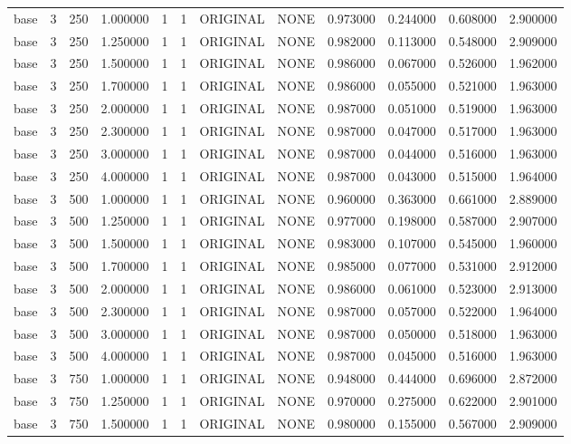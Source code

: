 \begin{tabular}{lrrrllllrrrr}
base & 3 & 250 & 1.000000 & 1 & 1 & ORIGINAL & NONE & 0.973000 & 0.244000 & 0.608000 & 2.900000 \\
base & 3 & 250 & 1.250000 & 1 & 1 & ORIGINAL & NONE & 0.982000 & 0.113000 & 0.548000 & 2.909000 \\
base & 3 & 250 & 1.500000 & 1 & 1 & ORIGINAL & NONE & 0.986000 & 0.067000 & 0.526000 & 1.962000 \\
base & 3 & 250 & 1.700000 & 1 & 1 & ORIGINAL & NONE & 0.986000 & 0.055000 & 0.521000 & 1.963000 \\
base & 3 & 250 & 2.000000 & 1 & 1 & ORIGINAL & NONE & 0.987000 & 0.051000 & 0.519000 & 1.963000 \\
base & 3 & 250 & 2.300000 & 1 & 1 & ORIGINAL & NONE & 0.987000 & 0.047000 & 0.517000 & 1.963000 \\
base & 3 & 250 & 3.000000 & 1 & 1 & ORIGINAL & NONE & 0.987000 & 0.044000 & 0.516000 & 1.963000 \\
base & 3 & 250 & 4.000000 & 1 & 1 & ORIGINAL & NONE & 0.987000 & 0.043000 & 0.515000 & 1.964000 \\
base & 3 & 500 & 1.000000 & 1 & 1 & ORIGINAL & NONE & 0.960000 & 0.363000 & 0.661000 & 2.889000 \\
base & 3 & 500 & 1.250000 & 1 & 1 & ORIGINAL & NONE & 0.977000 & 0.198000 & 0.587000 & 2.907000 \\
base & 3 & 500 & 1.500000 & 1 & 1 & ORIGINAL & NONE & 0.983000 & 0.107000 & 0.545000 & 1.960000 \\
base & 3 & 500 & 1.700000 & 1 & 1 & ORIGINAL & NONE & 0.985000 & 0.077000 & 0.531000 & 2.912000 \\
base & 3 & 500 & 2.000000 & 1 & 1 & ORIGINAL & NONE & 0.986000 & 0.061000 & 0.523000 & 2.913000 \\
base & 3 & 500 & 2.300000 & 1 & 1 & ORIGINAL & NONE & 0.987000 & 0.057000 & 0.522000 & 1.964000 \\
base & 3 & 500 & 3.000000 & 1 & 1 & ORIGINAL & NONE & 0.987000 & 0.050000 & 0.518000 & 1.963000 \\
base & 3 & 500 & 4.000000 & 1 & 1 & ORIGINAL & NONE & 0.987000 & 0.045000 & 0.516000 & 1.963000 \\
base & 3 & 750 & 1.000000 & 1 & 1 & ORIGINAL & NONE & 0.948000 & 0.444000 & 0.696000 & 2.872000 \\
base & 3 & 750 & 1.250000 & 1 & 1 & ORIGINAL & NONE & 0.970000 & 0.275000 & 0.622000 & 2.901000 \\
base & 3 & 750 & 1.500000 & 1 & 1 & ORIGINAL & NONE & 0.980000 & 0.155000 & 0.567000 & 2.909000 \\

\end{tabular}
